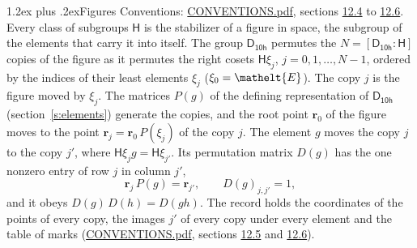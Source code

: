\documentclass[10pt,a4paper]{article}
\makeatletter
\renewcommand\section{\@startsection{section}{1}{\z@}{-3ex plus -1ex minus -.2ex}%
  {1.2ex plus .2ex}{\normalfont\large\sffamily\bfseries\color{parttitle}}}
\numberwithin{equation}{section}
\newcommand{\eltfont}[1]{{\let\sigma\eltsigma\mathelt{#1}}}
\newcommand{\grp}[1]{\mathsf{#1}}
\newcommand{\cls}[1]{\eltfont{#1}}
\newcommand{\pointr}{\mathbf{r}}
\makeatother
\begin{document}
\section{Figures}\label{s:permutation}
Conventions: \href{../../CONVENTIONS.pdf}{CONVENTIONS.pdf}, sections \href{../../CONVENTIONS.pdf\#conv.12.4}{12.4} to \href{../../CONVENTIONS.pdf\#conv.12.6}{12.6}.
Every class of subgroups $\grp{H}$ is the stabilizer of a figure in space, the subgroup of the elements that carry it into itself. \label{n:local.orbit.size}\label{n:element.coset.least}\label{n:index.coset}The group $\grp{D_{10h}}$ permutes the $N = [\grp{D_{10h}} : \grp{H}]$ copies of the figure as it permutes the right cosets $\grp{H}\xi_j$, $j = 0, 1, \dots, N - 1$, ordered by the indices of their least elements $\xi_j$ ($\xi_0 = \cls{E}$). The copy $j$ is the figure moved by $\xi_j$. The matrices $P(g)$ of the defining representation of $\grp{D_{10h}}$ (section~\ref{s:elements}) generate the copies, and the root point $\pointr_0$ of the figure moves to the point $\pointr_j = \pointr_0\, P(\xi_j)$ of the copy $j$. \label{n:local.coset.image}The element $g$ moves the copy $j$ to the copy $j'$, where $\grp{H}\xi_j g = \grp{H}\xi_{j'}$. \label{n:local.matrix.permutation}Its permutation matrix $D(g)$ has the one nonzero entry of row $j$ in column $j'$,
\begin{equation}\label{e:perm.matrix}\pointr_j\, P(g) = \pointr_{j'}, \qquad D(g)_{j,j'} = 1,\end{equation}
and it obeys $D(g)\, D(h) = D(gh)$. The record holds the coordinates of the points of every copy, the images $j'$ of every copy under every element and the table of marks (\href{../../CONVENTIONS.pdf}{CONVENTIONS.pdf}, sections \href{../../CONVENTIONS.pdf\#conv.12.5}{12.5} and \href{../../CONVENTIONS.pdf\#conv.12.6}{12.6}).
\end{document}
